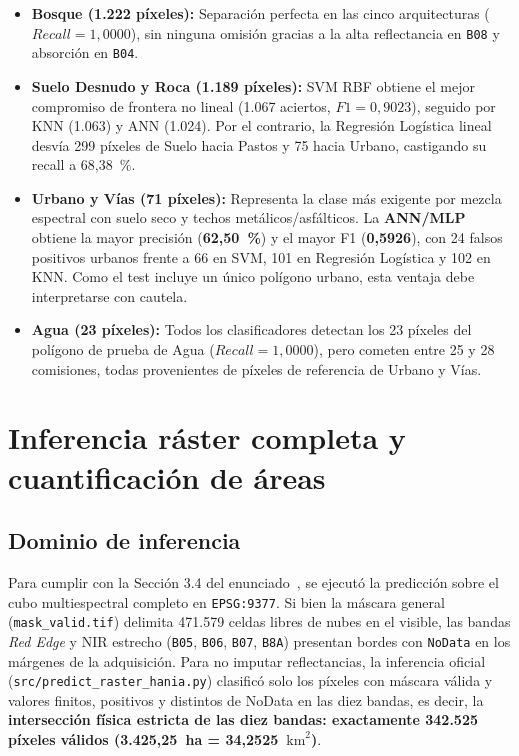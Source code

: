 \documentclass[11pt,a4paper]{article}
\begin{document}
\begin{itemize}[leftmargin=*,noitemsep,topsep=2pt]
    \item \textbf{Bosque (1.222 píxeles):} Separación perfecta en las cinco arquitecturas ($Recall = 1,0000$), sin ninguna omisión gracias a la alta reflectancia en \texttt{B08} y absorción en \texttt{B04}.
    \item \textbf{Suelo Desnudo y Roca (1.189 píxeles):} SVM RBF obtiene el mejor compromiso de frontera no lineal (1.067 aciertos, $F1 = 0,9023$), seguido por KNN (1.063) y ANN (1.024). Por el contrario, la Regresión Logística lineal desvía 299 píxeles de Suelo hacia Pastos y 75 hacia Urbano, castigando su recall a 68,38~\%.
    \item \textbf{Urbano y Vías (71 píxeles):} Representa la clase más exigente por mezcla espectral con suelo seco y techos metálicos/asfálticos. La \textbf{ANN/MLP} obtiene la mayor precisión (\textbf{62,50~\%}) y el mayor F1 (\textbf{0,5926}), con 24 falsos positivos urbanos frente a 66 en SVM, 101 en Regresión Logística y 102 en KNN. Como el test incluye un único polígono urbano, esta ventaja debe interpretarse con cautela.
    \item \textbf{Agua (23 píxeles):} Todos los clasificadores detectan los 23 píxeles del polígono de prueba de Agua ($Recall = 1,0000$), pero cometen entre 25 y 28 comisiones, todas provenientes de píxeles de referencia de Urbano y Vías.
\end{itemize}

\section{Inferencia ráster completa y cuantificación de áreas}

\subsection{Dominio de inferencia}
Para cumplir con la Sección 3.4 del enunciado~\cite{calderon2026}, se ejecutó la predicción sobre el cubo multiespectral completo en \texttt{EPSG:9377}. Si bien la máscara general (\texttt{mask\_valid.tif}) delimita 471.579 celdas libres de nubes en el visible, las bandas \textit{Red Edge} y NIR estrecho (\texttt{B05}, \texttt{B06}, \texttt{B07}, \texttt{B8A}) presentan bordes con \texttt{NoData} en los márgenes de la adquisición. Para no imputar reflectancias, la inferencia oficial (\texttt{src/predict\_raster\_hania.py}) clasificó solo los píxeles con máscara válida y valores finitos, positivos y distintos de NoData en las diez bandas, es decir, la \textbf{intersección física estricta de las diez bandas: exactamente 342.525 píxeles válidos (3.425,25~ha = 34,2525~$\text{km}^2$)}.
\end{document}
